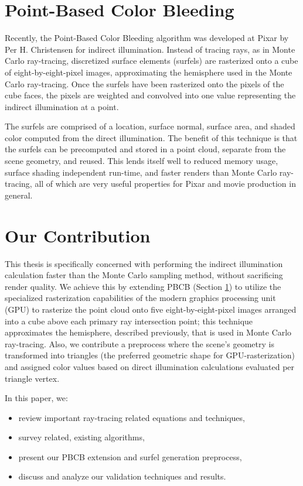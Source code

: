 \section{Point-Based Color Bleeding}
\label{sec:PBCB}
Recently, the Point-Based Color Bleeding algorithm was developed at Pixar by Per H. Christensen \cite{christensen:2008} for indirect illumination. Instead of tracing rays, as in Monte Carlo ray-tracing, discretized surface elements (surfels) are rasterized onto a cube of eight-by-eight-pixel images, approximating the hemisphere used in the Monte Carlo ray-tracing. Once the surfels have been rasterized onto the pixels of the cube faces, the pixels are weighted and convolved into one value representing the indirect illumination at a point.

The surfels are comprised of a location, surface normal, surface area, and shaded color computed from the direct illumination. The benefit of this technique is that the surfels can be precomputed and stored in a point cloud, separate from the scene geometry, and reused. This lends itself well to reduced memory usage, surface shading independent run-time, and faster renders than Monte Carlo ray-tracing, all of which are very useful properties for Pixar and movie production in general.

\section{Our Contribution}
This thesis is specifically concerned with performing the indirect illumination calculation faster than the Monte Carlo sampling method, without sacrificing render quality. We achieve this by extending PBCB (Section \ref{sec:PBCB}) to utilize the specialized rasterization capabilities of the modern graphics processing unit (GPU) to rasterize the point cloud onto five eight-by-eight-pixel images arranged into a cube above each primary ray intersection point; this technique approximates the hemisphere, described previously, that is used in Monte Carlo ray-tracing. Also, we contribute a preprocess where the scene’s geometry is transformed into triangles (the preferred geometric shape for GPU-rasterization) and assigned color values based on direct illumination calculations evaluated per triangle vertex.

\noindent In this paper, we:
\begin{itemize}
\item review important ray-tracing related equations and techniques,
\item survey related, existing algorithms,
\item present our PBCB extension and surfel generation preprocess,
\item discuss and analyze our validation techniques and results.
\end{itemize}


